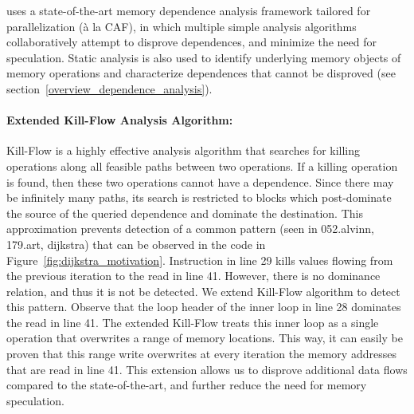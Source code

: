 \name uses a state-of-the-art memory dependence analysis framework
tailored for parallelization (\`{a} la CAF\cite{johnson:cgo:17}), in
which multiple simple analysis algorithms collaboratively attempt to
disprove dependences, and minimize the need for speculation.
%
Static analysis is also used to identify underlying memory objects of
memory operations and characterize dependences that cannot
be disproved (see section~\ref{overview_dependence_analysis}).

\paragraph{Extended Kill-Flow Analysis Algorithm:}
Kill-Flow is a highly effective analysis algorithm that searches for
killing operations along all feasible paths between two operations. If
a killing operation is found, then these two operations cannot have a
dependence.  Since  there  may  be  infinitely  many  paths,  its
search is restricted to blocks which post-dominate the source of the
queried dependence and dominate the destination.
%
This approximation prevents detection of a common pattern (seen in
052.alvinn, 179.art, dijkstra) that can be observed in the code in
Figure~\ref{fig:dijkstra_motivation}.
%
Instruction in line 29 kills values flowing from the previous
iteration to the read in line 41.  However, there is no dominance
relation, and thus it is not be detected.
%
We extend Kill-Flow algorithm to detect this pattern.  Observe that
the loop header of the inner loop in line 28 dominates the read in
line 41.  The extended Kill-Flow treats this inner loop as a single
operation that overwrites a range of memory locations. This way, it
can easily be proven that this range write overwrites at every
iteration the memory addresses that are read in line 41.
%
%
This extension allows us to disprove additional data flows compared to
the state-of-the-art, and further reduce the need for memory
speculation.
